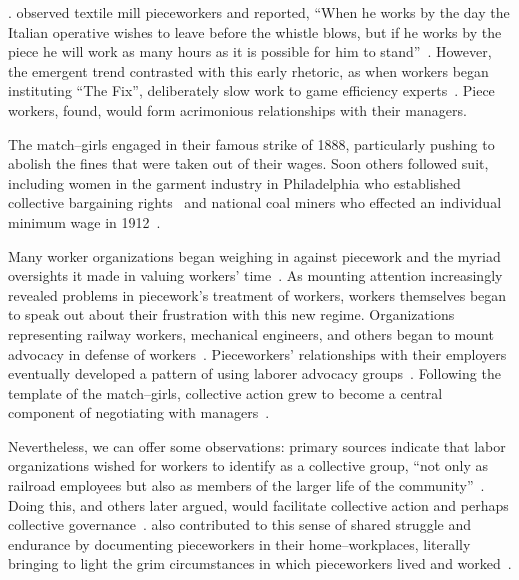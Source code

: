 \documentclass[trackingWork]{subfiles}
\begin{document}
.
\citeauthor{clark1908cotton} observed textile mill pieceworkers and reported,
``When he works by the day the Italian operative wishes to leave before the whistle blows,
but if he works by the piece he will work as many hours as it is possible for him to stand''~\cite{clark1908cotton}.
However, the emergent trend contrasted with this early rhetoric, as
when workers began instituting ``The Fix'', deliberately slow work to game efficiency experts~\cite{roy1954efficiency}.
Piece workers, \citeauthor{roy1954efficiency} found, would form acrimonious relationships with their managers.

The match--girls engaged in their famous strike of 1888, particularly pushing to abolish the fines that were taken out of their wages.
Soon others followed suit, including women in the garment industry in Philadelphia who established collective bargaining rights~\cite{10.2307/41829256} and national coal miners who effected an individual minimum wage in 1912~\cite{10.2307/2221944}.


Many worker organizations began weighing in against
piecework and the myriad oversights it made in valuing workers' time~\cite{american1921problem,richards1904anything}.
As mounting attention increasingly revealed problems in piecework's treatment of workers,
workers themselves began to speak out about their frustration with this new regime.
Organizations representing
railway workers,
mechanical engineers, and
others began to mount advocacy in defense of workers~\cite{american1921problem,richards1904anything}.
Pieceworkers' relationships with their employers eventually developed a pattern of using 
laborer advocacy groups~\cite{levi2009union,ahlquist2013interest,mccallum2013global,jacoby1983union}.
Following the template of the match--girls, collective action grew to become a central component of negotiating with managers~\cite{russell1982collective,olsonlogic}.

Nevertheless, we can offer some observations:
primary sources indicate that labor organizations wished for workers to identify as a collective group, 
``not only as railroad employees but also as members of the larger life of the community''~\cite{american1921problem}.
Doing this, 
\citeauthor{ostrom1990governing} and others later argued,
would facilitate collective action and perhaps collective governance~\cite{ostrom1990governing,russell1982collective,olsonlogic}.
\citeauthor{riisOtherSideLives} also contributed to this sense of shared struggle and endurance
by documenting pieceworkers in their home--workplaces,
literally bringing to light the grim circumstances in which pieceworkers lived and worked~\cite{riisOtherSideLives}.
\end{document}

